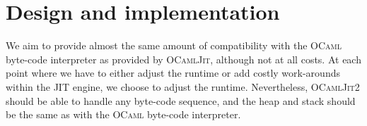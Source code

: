 \documentclass[10pt,a4paper,twocolumn]{article}
\begin{document}






\section{Design and implementation} \label{section:Design_and_implementation}

We aim to provide almost the same amount of compatibility with the \textsc{OCaml} byte-code interpreter
as provided by \textsc{OCamlJit}, although not at all costs. At each point where we have to either
adjust the runtime or add costly work-arounds within the JIT engine, we choose to adjust the
runtime. Nevertheless, \textsc{OCamlJit2} should be able to handle any byte-code sequence, and the
heap and stack should be the same as with the \textsc{OCaml} byte-code interpreter.
\end{document}
